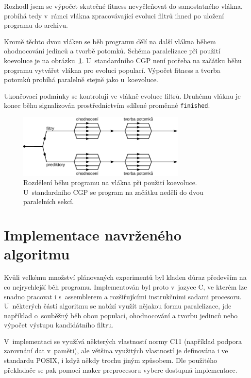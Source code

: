 Rozhodl jsem se výpočet skutečné fitness nevyčleňovat do samostatného vlákna, probíhá tedy v~rámci vlákna zpracovávající evoluci filtrů ihned po uložení programu do archivu.

Kromě těchto dvou vláken se běh programu dělí na další vlákna během ohodnocování jedinců a tvorbě potomků. Schéma paralelizace při použití koevoluce je na obrázku~\ref{obrParalelizace}. U~standardního CGP není potřeba na začátku běhu programu vytvářet vlákna pro evoluci populací. Výpočet fitness a tvorba potomků probíhá paralelně stejně jako u~koevoluce.

Ukončovací podmínky se kontrolují ve vlákně evoluce filtrů. Druhému vláknu je konec běhu signalizován prostřednictvím sdílené proměnné \texttt{finished}.

\begin{figure}[htb]
    \centering
    \includegraphics[width=0.75\textwidth]{fig/openmp}
    \caption{Rozdělení běhu programu na vlákna při použití koevoluce. U~standardního CGP se program na začátku nedělí do dvou paralelních sekcí.}
    \label{obrParalelizace}
\end{figure}


\chapter{Implementace navrženého algoritmu}
\label{chImplementation}

Kvůli velkému množství plánovaných experimentů byl kladen důraz především na co nejrychlejší běh programu. Implementován byl proto v~jazyce C, ve kterém lze snadno pracovat i s~assemblerem a rozšiřujícími instrukčními sadami procesoru. U~některých částí algoritmu se nabízí využít nějakou formu paralelizace, jde například o~souběžný běh obou populací, ohodnocování a tvorbu jedinců nebo výpočet výstupu kandidátního filtru.

V~implementaci se využívá některých vlastností normy C11 (například podpora zarovnání dat v~paměti), ale většina využitých vlastností je definována i ve standardu POSIX, i když někdy trochu jiným způsobem. Dle použitého překladače se pak pomocí maker preprocesoru vybere dostupná implementace.

